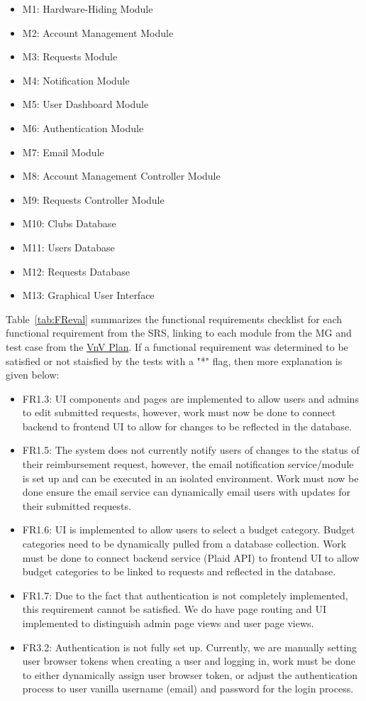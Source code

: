 \documentclass[12pt, titlepage]{article}
\begin{document}
\begin{itemize}
    \item M1: Hardware-Hiding Module
    \item M2: Account Management Module
    \item M3: Requests Module
    \item M4: Notification Module
    \item M5: User Dashboard Module
    \item M6: Authentication Module
    \item M7: Email Module
    \item M8: Account Management Controller Module
    \item M9: Requests Controller Module
    \item M10: Clubs Database
    \item M11: Users Database
    \item M12: Requests Database
    \item M13: Graphical User Interface
\end{itemize}

Table~\ref{tab:FReval} summarizes the functional requirements checklist for each functional requirement from the SRS, linking to each module from the MG and test case from the \href{https://github.com/ausbennett/mes-finance-platform/blob/main/docs/VnVPlan/VnVPlan.pdf}{VnV Plan}. If a functional requirement was determined to be satisfied or not staisfied by the tests with a "*" flag, then more explanation is given below:

\begin{itemize}
    \item FR1.3: UI components and pages are implemented to allow users and admins to edit submitted requests, however, work must now be done to connect backend to frontend UI to allow for changes to be reflected in the database.
    \item FR1.5: The system does not currently notify users of changes to the status of their reimbursement request, however, the email notification service/module is set up and can be executed in an isolated environment. Work must now be done ensure the email service can dynamically email users with updates for their submitted requests.
    \item FR1.6: UI is implemented to allow users to select a budget category. Budget categories need to be dynamically pulled from a database collection. Work must be done to connect backend service (Plaid API) to frontend UI to allow budget categories to be linked to requests and reflected in the database.
    \item FR1.7: Due to the fact that authentication is not completely implemented, this requirement cannot be satisfied. We do have page routing and UI implemented to distinguish admin page views and user page views.
    \item FR3.2: Authentication is not fully set up. Currently, we are manually setting user browser tokens when creating a user and logging in, work must be done to either dynamically assign user browser token, or adjust the authentication process to user vanilla username (email) and password for the login process.
\end{itemize}
\end{document}
